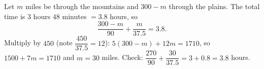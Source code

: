 Let $m$ miles be through the mountains and $300-m$ through the plains. The total time is $3$ hours $48$ minutes $=3.8$ hours, so
\[
\dfrac{300-m}{90}+\dfrac{m}{37.5}=3.8 .
\]
Multiply by $450$ (note $\dfrac{450}{37.5}=12$): $5(300-m)+12m=1710$, so $1500+7m=1710$ and $m=\boxed{30}$ miles. Check: $\dfrac{270}{90}+\dfrac{30}{37.5}=3+0.8=3.8$ hours.
